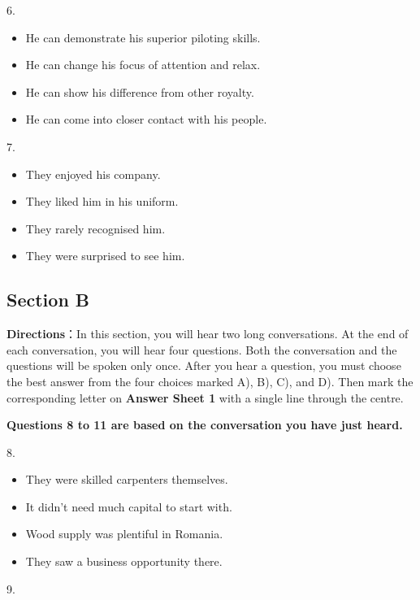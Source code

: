 \documentclass[UTF8,11pt]{ctexart}
\begin{document}
6.


\begin{itemize}[leftmargin=2em,itemsep=.2em,topsep=.4em]\item[A.] He can demonstrate his superior piloting skills.
\item[B.] He can change his focus of attention and relax.
\item[C.] He can show his difference from other royalty.
\item[D.] He can come into closer contact with his people.
\end{itemize}

7.


\begin{itemize}[leftmargin=2em,itemsep=.2em,topsep=.4em]\item[A.] They enjoyed his company.
\item[B.] They liked him in his uniform.
\item[C.] They rarely recognised him.
\item[D.] They were surprised to see him.
\end{itemize}

\subsection*{\textbf{Section B}}


\textbf{Directions}：In this section, you will hear two long conversations. At the end of each conversation, you will hear four questions. Both the conversation and the questions will be spoken only once. After you hear a question, you must choose the best answer from the four choices marked A), B), C), and D). Then mark the corresponding letter on\textbf{ Answer Sheet 1} with a single line through the centre.


\textbf{Questions 8 to 11 are based on the conversation you have just heard.}


8.


\begin{itemize}[leftmargin=2em,itemsep=.2em,topsep=.4em]\item[A.] They were skilled carpenters themselves.
\item[B.] It didn’t need much capital to start with.
\item[C.] Wood supply was plentiful in Romania.
\item[D.] They saw a business opportunity there.
\end{itemize}

9.
\end{document}
